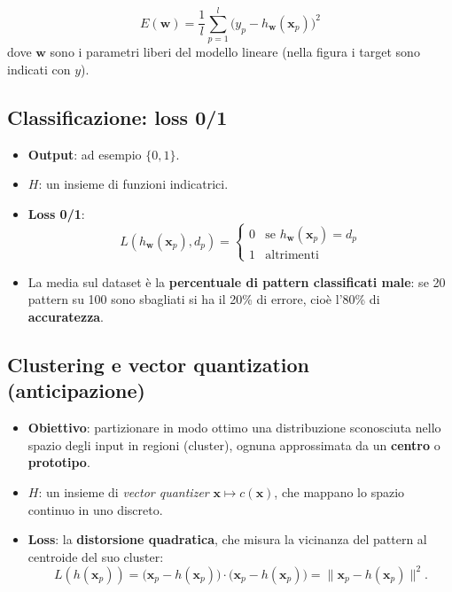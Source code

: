 \[
E(\mathbf{w}) = \frac{1}{l} \sum_{p=1}^{l} \big(y_p - h_\mathbf{w}(\mathbf{x}_p)\big)^2
\] dove \(\mathbf{w}\) sono i parametri liberi del modello lineare
(nella figura i target sono indicati con \(y\)).

\subsection{Classificazione: loss 0/1}\label{classificazione-loss-01}

\begin{itemize}
\tightlist
\item
  \textbf{Output}: ad esempio \(\{0, 1\}\).
\item
  \textbf{\(H\)}: un insieme di funzioni indicatrici.
\item
  \textbf{Loss 0/1}: \[
  L(h_\mathbf{w}(\mathbf{x}_p), d_p) = \begin{cases} 0 & \text{se } h_\mathbf{w}(\mathbf{x}_p) = d_p \\ 1 & \text{altrimenti} \end{cases}
  \]
\item
  La media sul dataset è la \textbf{percentuale di pattern classificati
  male}: se 20 pattern su 100 sono sbagliati si ha il 20\% di errore,
  cioè l'80\% di \textbf{accuratezza}.
\end{itemize}

\subsection{Clustering e vector quantization
(anticipazione)}\label{clustering-e-vector-quantization-anticipazione}

\begin{itemize}
\tightlist
\item
  \textbf{Obiettivo}: partizionare in modo ottimo una distribuzione
  sconosciuta nello spazio degli input in regioni (cluster), ognuna
  approssimata da un \textbf{centro} o \textbf{prototipo}.
\item
  \textbf{\(H\)}: un insieme di \emph{vector quantizer}
  \(\mathbf{x} \mapsto c(\mathbf{x})\), che mappano lo spazio continuo
  in uno discreto.
\item
  \textbf{Loss}: la \textbf{distorsione quadratica}, che misura la
  vicinanza del pattern al centroide del suo cluster: \[
  L(h(\mathbf{x}_p)) = \big(\mathbf{x}_p - h(\mathbf{x}_p)\big) \cdot \big(\mathbf{x}_p - h(\mathbf{x}_p)\big) = \|\mathbf{x}_p - h(\mathbf{x}_p)\|^2.
  \]
\end{itemize}

